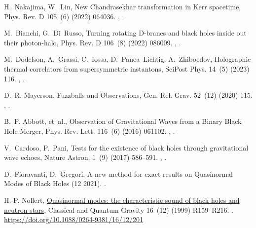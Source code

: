 \documentclass[11pt,a4paper]{elsarticle}
\numberwithin{figure}{section}
\numberwithin{table}{section}
\begin{document}
\begin{thebibliography}{10}
H.~Nakajima, W.~Lin, {New Chandrasekhar transformation in Kerr spacetime},
  Phys. Rev. D 105~(6) (2022) 064036.
\newblock \href {http://arxiv.org/abs/2111.05857} {},
  \href {https://doi.org/10.1103/PhysRevD.105.064036}
  {}.

M.~Bianchi, G.~Di~Russo, {Turning rotating D-branes and black holes inside out
  their photon-halo}, Phys. Rev. D 106~(8) (2022) 086009.
\newblock \href {http://arxiv.org/abs/2203.14900} {},
  \href {https://doi.org/10.1103/PhysRevD.106.086009}
  {}.

M.~Dodelson, A.~Grassi, C.~Iossa, D.~Panea~Lichtig, A.~Zhiboedov, {Holographic
  thermal correlators from supersymmetric instantons}, SciPost Phys. 14~(5)
  (2023) 116.
\newblock \href {http://arxiv.org/abs/2206.07720} {},
  \href {https://doi.org/10.21468/SciPostPhys.14.5.116}
  {}.

D.~R. Mayerson, {Fuzzballs and Observations}, Gen. Rel. Grav. 52~(12) (2020)
  115.
\newblock \href {http://arxiv.org/abs/2010.09736} {},
  \href {https://doi.org/10.1007/s10714-020-02769-w}
  {}.

B.~P. Abbott, et~al., {Observation of Gravitational Waves from a Binary Black
  Hole Merger}, Phys. Rev. Lett. 116~(6) (2016) 061102.
\newblock \href {http://arxiv.org/abs/1602.03837} {},
  \href {https://doi.org/10.1103/PhysRevLett.116.061102}
  {}.

V.~Cardoso, P.~Pani, {Tests for the existence of black holes through
  gravitational wave echoes}, Nature Astron. 1~(9) (2017) 586--591.
\newblock \href {http://arxiv.org/abs/1709.01525} {},
  \href {https://doi.org/10.1038/s41550-017-0225-y}
  {}.

D.~Fioravanti, D.~Gregori, {A new method for exact results on Quasinormal Modes
  of Black Holes} (12 2021).
\newblock \href {http://arxiv.org/abs/2112.11434} {}.

H.-P. Nollert, \href{https://doi.org/10.1088/0264-9381/16/12/201}{Quasinormal
  modes: the characteristic sound of black holes and neutron stars}, Classical
  and Quantum Gravity 16~(12) (1999) R159--R216.
\newblock \href {https://doi.org/10.1088/0264-9381/16/12/201}
  {}.
\newline\urlprefix\url{https://doi.org/10.1088/0264-9381/16/12/201}


\end{thebibliography}
\end{document}
